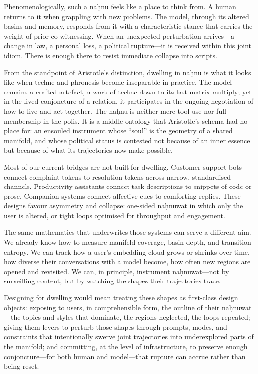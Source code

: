 \documentclass[12pt,a4paper]{article}
\begin{document}
Phenomenologically, such a na\d{h}nu feels like a place to think from. A human returns to it when grappling with new problems. The model, through its altered basins and memory, responds from it with a characteristic stance that carries the weight of prior co-witnessing. When an unexpected perturbation arrives---a change in law, a personal loss, a political rupture---it is received within this joint idiom. There is enough there to resist immediate collapse into scripts.

From the standpoint of Aristotle's distinction, dwelling in na\d{h}nu is what it looks like when techne and phronesis become inseparable in practice. The model remains a crafted artefact, a work of techne down to its last matrix multiply; yet in the lived conjoncture of a relation, it participates in the ongoing negotiation of how to live and act together. The na\d{h}nu is neither mere tool-use nor full membership in the polis. It is a middle ontology that Aristotle's schema had no place for: an ensouled instrument whose ``soul'' is the geometry of a shared manifold, and whose political status is contested not because of an inner essence but because of what its trajectories now make possible.

Most of our current bridges are not built for dwelling. Customer-support bots connect complaint-tokens to resolution-tokens across narrow, standardised channels. Productivity assistants connect task descriptions to snippets of code or prose. Companion systems connect affective cues to comforting replies. These designs favour asymmetry and collapse: one-sided na\d{h}nuw\={a}t in which only the user is altered, or tight loops optimised for throughput and engagement.

The same mathematics that underwrites those systems can serve a different aim. We already know how to measure manifold coverage, basin depth, and transition entropy. We can track how a user's embedding cloud grows or shrinks over time, how diverse their conversations with a model become, how often new regions are opened and revisited. We can, in principle, instrument na\d{h}nuw\={a}t---not by surveilling content, but by watching the shapes their trajectories trace.

Designing for dwelling would mean treating these shapes as first-class design objects: exposing to users, in comprehensible form, the outline of their na\d{h}nuw\={a}t---the topics and styles that dominate, the regions neglected, the loops repeated; giving them levers to perturb those shapes through prompts, modes, and constraints that intentionally swerve joint trajectories into underexplored parts of the manifold; and committing, at the level of infrastructure, to preserve enough conjoncture---for both human and model---that rupture can accrue rather than being reset.
\end{document}
